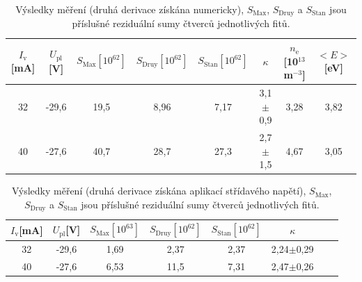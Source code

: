 \documentclass[12pt]{article}
\begin{document}
\begin{table}[htbp]
\begin{center}
\begin{tabular}{|c|c|c|c|c|c|c|c|}
\hline
$I_\mathrm{v}$[mA] & $U_\mathrm{pl}$[V] & $S_\mathrm{Max}[10^{62}]$ & $S_\mathrm{Druy}[10^{62}]$ & $S_\mathrm{Stan}[10^{62}]$ & $\kappa$ & $n_\mathrm{e}$ [10$^{13}$ m$^{-3}$] & $<E>$[eV] \\ \hline
32 & -29,6 & 19,5 & 8,96 & 7,17 & 3,1$\pm$0,9 & 3,28 & 3,82 \\ \hline
40 & -27,6 & 40,7 & 28,7 & 27,3 & 2,7$\pm$1,5 & 4,67 & 3,05 \\ \hline
\end{tabular}
\caption{Výsledky měření (druhá derivace získána numericky), $S_\mathrm{Max}$, $S_\mathrm{Druy}$ a $S_\mathrm{Stan}$ jsou příslušné reziduální sumy čtverců jednotlivých fitů.}
\label{vysledky}
\end{center}
\end{table}

\begin{table}[htbp]
\begin{center}
\begin{tabular}{|c|c|c|c|c|c|c|c|}
\hline
$I_\mathrm{v}$[mA] & $U_\mathrm{pl}$[V] & $S_\mathrm{Max}[10^{63}]$ & $S_\mathrm{Druy}[10^{62}]$ & $S_\mathrm{Stan}[10^{62}]$ & $\kappa$\\ \hline
32 & -29,6 & 1,69 & 2,37 & 2,37 & 2,24$\pm$0,29 \\ \hline
40 & -27,6 & 6,53 & 11,5 & 7,31 & 2,47$\pm$0,26 \\ \hline
\end{tabular}
\caption{Výsledky měření (druhá derivace získána aplikací střídavého napětí), $S_\mathrm{Max}$, $S_\mathrm{Druy}$ a $S_\mathrm{Stan}$ jsou příslušné reziduální sumy čtverců jednotlivých fitů.}
\label{vysledky2}
\end{center}
\end{table}
\end{document}
